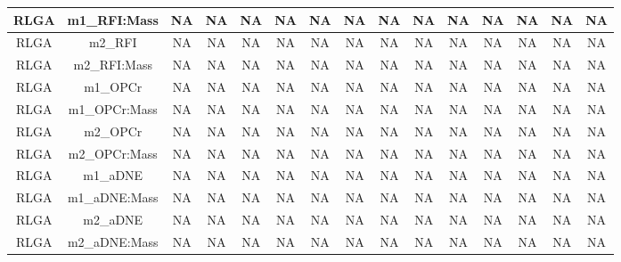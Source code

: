 \begin{longtable}[t]{c|c|c|c|c|c|c|c|c|c|c|c|c|c|c}
\hline
RLGA & m1_RFI:Mass & NA & NA & NA & NA & NA & NA & NA & NA & NA & NA & NA & NA & NA\\
\hline
RLGA & m2_RFI & NA & NA & NA & NA & NA & NA & NA & NA & NA & NA & NA & NA & NA\\
\hline
RLGA & m2_RFI:Mass & NA & NA & NA & NA & NA & NA & NA & NA & NA & NA & NA & NA & NA\\
\hline
RLGA & m1_OPCr & NA & NA & NA & NA & NA & NA & NA & NA & NA & NA & NA & NA & NA\\
\hline
RLGA & m1_OPCr:Mass & NA & NA & NA & NA & NA & NA & NA & NA & NA & NA & NA & NA & NA\\
\hline
RLGA & m2_OPCr & NA & NA & NA & NA & NA & NA & NA & NA & NA & NA & NA & NA & NA\\
\hline
RLGA & m2_OPCr:Mass & NA & NA & NA & NA & NA & NA & NA & NA & NA & NA & NA & NA & NA\\
\hline
RLGA & m1_aDNE & NA & NA & NA & NA & NA & NA & NA & NA & NA & NA & NA & NA & NA\\
\hline
RLGA & m1_aDNE:Mass & NA & NA & NA & NA & NA & NA & NA & NA & NA & NA & NA & NA & NA\\
\hline
RLGA & m2_aDNE & NA & NA & NA & NA & NA & NA & NA & NA & NA & NA & NA & NA & NA\\
\hline
RLGA & m2_aDNE:Mass & NA & NA & NA & NA & NA & NA & NA & NA & NA & NA & NA & NA & NA\\
\hline
\end{longtable}
\endgroup{}
